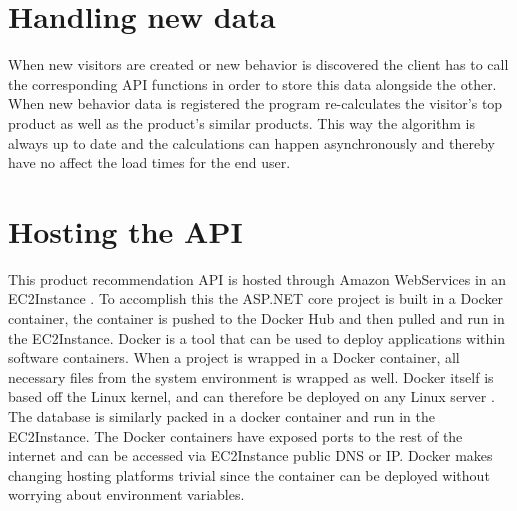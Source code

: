 \section{Handling new data}
When new visitors are created or new behavior is discovered the client has to call the corresponding API functions in order to store this data alongside the other. When new behavior data is registered the program re-calculates the visitor's top product as well as the product's similar products. This way the algorithm is always up to date and the calculations can happen asynchronously and thereby have no affect the load times for the end user.

\section{Hosting the API}
This product recommendation API is hosted through Amazon WebServices in an \gls{EC2Instance} \cite{EC2}. To accomplish this the ASP.NET core project is built in a Docker container, the container is pushed to the Docker Hub and then pulled and run in the \gls{EC2Instance}. Docker is a tool that can be used to deploy applications within software containers. When a project is wrapped in a Docker container, all necessary files from the system environment is wrapped as well. Docker itself is based off the Linux kernel, and can therefore be deployed on any Linux server \cite{Docker}.  The database is similarly packed in a docker container and run in the \gls{EC2Instance}. The Docker containers have exposed ports to the rest of the internet and can be accessed via \gls{EC2Instance} public DNS or IP.  Docker makes changing hosting platforms trivial since the container can be deployed without worrying about environment variables.



			


 